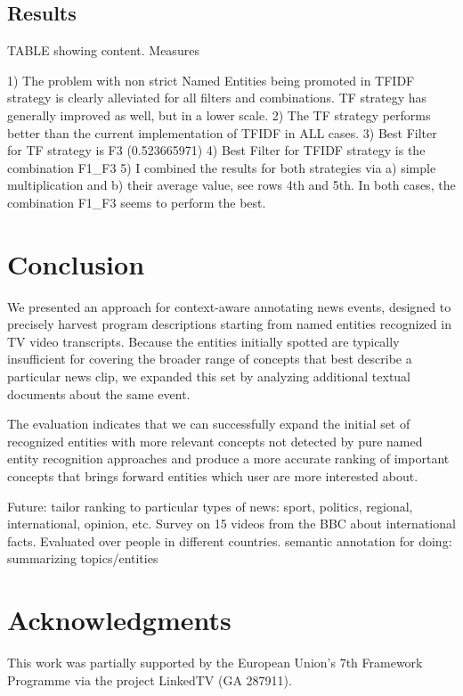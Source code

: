 \documentclass{llncs}
\begin{document}
\subsection{Results}


TABLE showing content. Measures

1) The problem with non strict Named Entities being promoted in TFIDF strategy is clearly alleviated for all filters and combinations. TF strategy has generally improved as well, but in a lower scale.
2) The TF strategy performs better than the current implementation of TFIDF in ALL cases.
3) Best Filter for TF strategy is F3 (0.523665971)
4) Best Filter for TFIDF strategy is the combination F1\_F3
5) I combined the results for both strategies via a) simple multiplication and b) their average value, see rows 4th and 5th. In both cases, the combination F1\_F3 seems to perform the best.



\section{Conclusion}
\label{sec:Conclusion}
We presented an approach for context-aware annotating news events, designed to precisely harvest program descriptions starting from named entities recognized in TV video transcripts. Because the entities initially spotted are typically insufficient for covering the broader range of concepts that best describe a particular news clip, we expanded this set by analyzing additional textual documents about the same event.

The evaluation indicates that we can successfully expand the initial set of recognized entities with more relevant concepts not detected by pure named entity recognition approaches and produce a more accurate ranking of important concepts that brings forward entities which user are more interested about.

Future: tailor ranking to particular types of news: sport, politics, regional, international, opinion, etc. Survey on 15 videos from the BBC about international facts. Evaluated over people in different countries.
semantic annotation for doing: summarizing topics/entities



\section*{Acknowledgments}
This work was partially supported by the European Union's 7th Framework Programme via the project LinkedTV (GA 287911).



\end{document}

